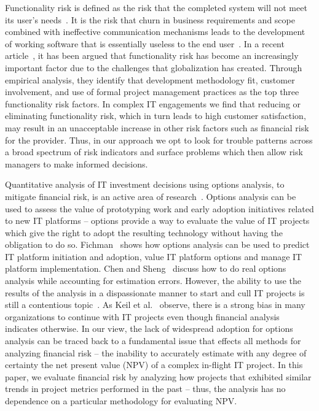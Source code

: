 Functionality risk is defined as the risk that the completed system will not meet its user's needs~\cite{risk11}.  It is the risk that churn in business requirements and scope combined with ineffective communication mechanisms leads to the development of working software that is essentially useless to the end user~\cite{risk12}. In a recent article~\cite{risk13}, it has been argued that functionality risk has become an increasingly important factor due to the challenges  that globalization has created. Through empirical analysis, they identify that development methodology fit, customer involvement, and use of formal project management practices as the top three functionality risk factors. In complex IT engagements we find that reducing or eliminating functionality risk, which in turn leads to high customer satisfaction, may result in an unacceptable increase in other risk factors such as financial risk for the provider. Thus, in our approach we opt to look for trouble patterns across a broad spectrum of risk indicators and surface problems which then allow risk managers to make informed decisions.

Quantitative analysis of IT investment decisions using options analysis, to mitigate financial risk, is an active area of research~\cite{14,15,16}. Options analysis can be used to assess the value of prototyping work and early adoption initiatives related to new IT platforms – options provide a way to evaluate the value of IT projects which give the right to adopt the resulting technology without having the obligation to do so. Fichman~\cite{risk14} shows how options analysis can be used to predict IT platform initiation and adoption, value IT platform options and manage IT platform implementation. Chen and Sheng~\cite{risk15} discuss how to do real options analysis while accounting for estimation errors. However, the ability to use the results of the analysis in a dispassionate manner to start and cull IT projects is still a contentious topic~\cite{risk17}. As Keil et al.~\cite{risk18} observe, there is a strong bias in many organizations to continue with IT projects even though financial analysis indicates otherwise. In our view, the lack of widespread adoption for options analysis can be traced back to a fundamental issue that effects all methods for analyzing financial risk – the inability to accurately estimate with any degree of certainty the net present value (NPV) of a complex in-flight IT project. In this paper,  we evaluate financial risk by analyzing how projects that exhibited similar trends in project metrics performed in the past – thus, the analysis has no dependence on a particular methodology for evaluating NPV.

